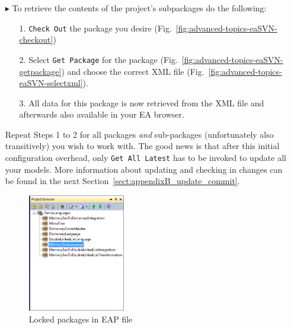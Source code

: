 \begin{enumerate}
\item[$\blacktriangleright$] To retrieve the contents of the project's subpackages do the following:
\begin{enumerate}
\item[1.] \texttt{Check Out} the package you desire (Fig.~\ref{fig:advanced-topics-eaSVN-checkout})
\item[2.] Select \texttt{Get Package} for the package (Fig.~\ref{fig:advanced-topics-eaSVN-getpackage}) and choose the correct XML file (Fig.~\ref{fig:advanced-topics-eaSVN-selectxml}).
\item[3.] All data for this package is now retrieved from the XML file and afterwards also available in your EA browser.
\end{enumerate}
Repeat Steps 1 to 2 for all packages \emph{and} sub-packages (unfortunately also transitively) you wish to work with. 
The good news is that after this initial configuration overhead, only \texttt{Get All Latest} has to be invoked to update all your models. 
More information about updating and checking in changes can be found in the next Section~\ref{sect:appendixB_update_commit}. 
\begin{figure}[htbp]
\begin{center}
	\includegraphics[width=0.4\textwidth]{pics/advancedTopics/eaSVN/DemoLanguages/006.png}
	\caption{Locked packages in EAP file}
  	\label{fig:advanced-topics-eaSVN-locked}
\end{center}
\end{figure}


\end{enumerate}
